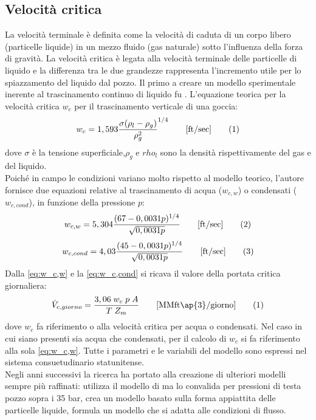 \subsection{Velocità critica}
La velocità terminale è definita come la velocità di caduta di un corpo libero (particelle liquide) in un mezzo fluido (gas naturale) sotto l'influenza della forza di gravità. La velocità critica è legata alla velocità terminale delle particelle di liquido e la differenza tra le due grandezze rappresenta l'incremento utile per lo spiazzamento del liquido dal pozzo. Il primo a creare un modello sperimentale inerente al trascinamento continuo di liquido fu \textcite{turner1969analysis}. L'equazione teorica per la velocità critica \(w_c\) per il trascinamento verticale di una goccia:
\[w_c= 1,593\dfrac{\sigma{(\rho_l-\rho_g)}}{\rho_g^2}^{1/4} \qquad\textrm{[ft/sec]} \addtag \label{eq:turnerwc} \]
dove \(\sigma\) è la tensione superficiale,\(\rho_g\) e \(rho_l\) sono la densità rispettivamente del gas e del liquido.\\
Poiché in campo le condizioni variano molto rispetto al modello teorico, l'autore fornisce due equazioni relative al trascinamento di acqua (\(w_{c,w}\)) o condensati (\(w_{c,cond}\)), in funzione della pressione \(p\):
\[w_{c,w} = 5,304 \dfrac{(67-0,0031p)^{1/4}}{\sqrt{0,0031p}}  \qquad\textrm{[ft/sec]} \label{eq:w_c,w} \addtag\]
\[w_{c,cond} = 4,03 \dfrac{(45-0,0031p)^{1/4}}{\sqrt{0,0031p}}  \qquad\textrm{[ft/sec]} \label{eq:w_c,cond} \addtag\]
 Dalla \eqref{eq:w_c,w} e la \eqref{eq:w_c,cond} si ricava il valore della portata critica giornaliera:
\[\dot{V}_{c,giorno}=\dfrac{3,06 \; w_c \; p \; A}{T \; Z_m}  \qquad \textrm{[MMft\ap{3}/giorno]} \addtag \]
dove \(w_c\) fa riferimento o alla velocità critica per acqua o condensati. Nel caso in cui siano presenti sia acqua che condensati, per il calcolo di \(w_c\) si fa riferimento alla sola \eqref{eq:w_c,w}. Tutte i parametri e le variabili del modello sono espressi nel sistema consuetudinario statunitense. \\
Negli anni successivi la ricerca ha portato alla creazione di ulteriori modelli sempre più raffinati: \textcite{coleman1991new} utilizza il modello di \citeauthor{turner1969analysis} ma lo convalida per pressioni di testa pozzo sopra i 35 bar, \textcite{li2001new} crea un modello basato sulla forma appiattita delle particelle liquide, \textcite{nosseir1997new} formula un modello che si adatta alle condizioni di flusso.

